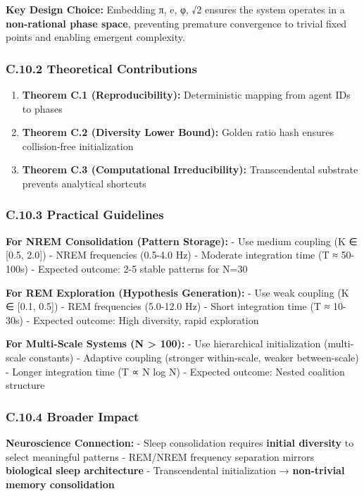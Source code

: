 \documentclass[
]{article}
\providecommand{\tightlist}{%
  \setlength{\itemsep}{0pt}\setlength{\parskip}{0pt}}
\begin{document}
\textbf{Key Design Choice:} Embedding π, e, φ, √2 ensures the system
operates in a \textbf{non-rational phase space}, preventing premature
convergence to trivial fixed points and enabling emergent complexity.

\subsubsection{C.10.2 Theoretical
Contributions}\label{c.10.2-theoretical-contributions}

\begin{enumerate}
\def\labelenumi{\arabic{enumi}.}
\tightlist
\item
  \textbf{Theorem C.1 (Reproducibility):} Deterministic mapping from
  agent IDs to phases
\item
  \textbf{Theorem C.2 (Diversity Lower Bound):} Golden ratio hash
  ensures collision-free initialization
\item
  \textbf{Theorem C.3 (Computational Irreducibility):} Transcendental
  substrate prevents analytical shortcuts
\end{enumerate}

\subsubsection{C.10.3 Practical
Guidelines}\label{c.10.3-practical-guidelines}

\textbf{For NREM Consolidation (Pattern Storage):} - Use medium coupling
(K ∈ {[}0.5, 2.0{]}) - NREM frequencies (0.5-4.0 Hz) - Moderate
integration time (T ≈ 50-100s) - Expected outcome: 2-5 stable patterns
for N=30

\textbf{For REM Exploration (Hypothesis Generation):} - Use weak
coupling (K ∈ {[}0.1, 0.5{]}) - REM frequencies (5.0-12.0 Hz) - Short
integration time (T ≈ 10-30s) - Expected outcome: High diversity, rapid
exploration

\textbf{For Multi-Scale Systems (N \textgreater{} 100):} - Use
hierarchical initialization (multi-scale constants) - Adaptive coupling
(stronger within-scale, weaker between-scale) - Longer integration time
(T ∝ N log N) - Expected outcome: Nested coalition structure

\subsubsection{C.10.4 Broader Impact}\label{c.10.4-broader-impact}

\textbf{Neuroscience Connection:} - Sleep consolidation requires
\textbf{initial diversity} to select meaningful patterns - REM/NREM
frequency separation mirrors \textbf{biological sleep architecture} -
Transcendental initialization → \textbf{non-trivial memory
consolidation}
\end{document}
